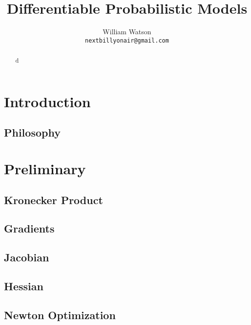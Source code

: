 \documentclass{article}
\title{Differentiable Probabilistic Models}
\author{%
  William Watson \\
  \texttt{nextbillyonair@gmail.com} \\
}
\begin{document}

\maketitle

\begin{abstract}
  d
\end{abstract}

\newpage
\tableofcontents


\section{Introduction}
\subsection{Philosophy}

\section{Preliminary}
\subsection{Kronecker Product}
\subsection{Gradients}
\subsection{Jacobian}
\subsection{Hessian}
\subsection{Newton Optimization}

\end{document}
